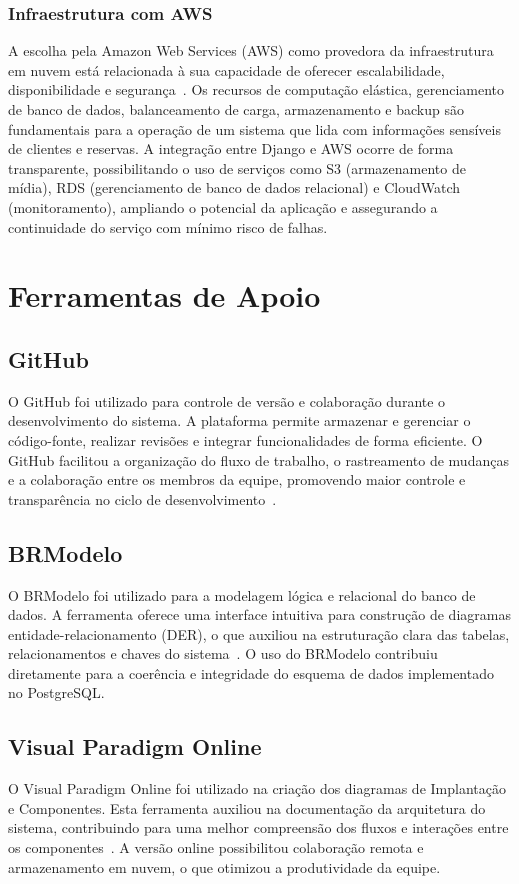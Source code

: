 \documentclass[
	12pt,				%
	openany,			%
	twoside,			%
	a4paper,			%
	english,			%
	french,				%
	spanish,			%
	brazil				%
	]{abntex2}
\begin{document}
\subsubsection{Infraestrutura com AWS}
A escolha pela Amazon Web Services (AWS) como provedora da infraestrutura em nuvem está relacionada à sua capacidade de oferecer escalabilidade, disponibilidade e segurança~\cite{aws-doc}. Os recursos de computação elástica, gerenciamento de banco de dados, balanceamento de carga, armazenamento e backup são fundamentais para a operação de um sistema que lida com informações sensíveis de clientes e reservas.
A integração entre Django e AWS ocorre de forma transparente, possibilitando o uso de serviços como S3 (armazenamento de mídia), RDS (gerenciamento de banco de dados relacional) e CloudWatch (monitoramento), ampliando o potencial da aplicação e assegurando a continuidade do serviço com mínimo risco de falhas.


\section{Ferramentas de Apoio}
\subsection{GitHub}
O GitHub foi utilizado para controle de versão e colaboração durante o desenvolvimento do sistema. A plataforma permite armazenar e gerenciar o código-fonte, realizar revisões e integrar funcionalidades de forma eficiente. O GitHub facilitou a organização do fluxo de trabalho, o rastreamento de mudanças e a colaboração entre os membros da equipe, promovendo maior controle e transparência no ciclo de desenvolvimento~\cite{github-doc}.
\subsection{BRModelo}
O BRModelo foi utilizado para a modelagem lógica e relacional do banco de dados. A ferramenta oferece uma interface intuitiva para construção de diagramas entidade-relacionamento (DER), o que auxiliou na estruturação clara das tabelas, relacionamentos e chaves do sistema~\cite{brmodelo}. O uso do BRModelo contribuiu diretamente para a coerência e integridade do esquema de dados implementado no PostgreSQL.
\subsection{Visual Paradigm Online}
O Visual Paradigm Online foi utilizado na criação dos diagramas de Implantação e Componentes. Esta ferramenta auxiliou na documentação da arquitetura do sistema, contribuindo para uma melhor compreensão dos fluxos e interações entre os componentes~\cite{visual-paradigm}. A versão online possibilitou colaboração remota e armazenamento em nuvem, o que otimizou a produtividade da equipe.
\end{document}
